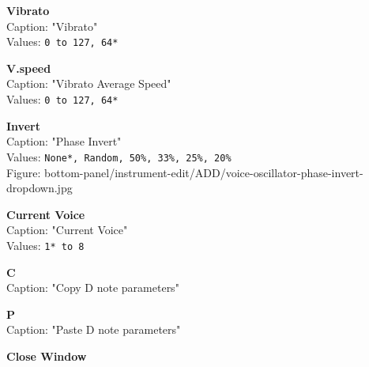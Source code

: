 \documentclass[
 11pt,
 twoside,
 a4paper,
 headinclude,
 footinclude,
 final                                 %
]{article}
\begin{document}
\begin{enumber}
\begin{enumber}
\begin{enumber}
\begin{enumber}
\begin{enumber}
\begin{enumber}
\begin{enumber}
                           \item \textbf{Vibrato} \\
                              Caption: "Vibrato" \\
                              Values: \texttt{0 to 127, 64*}
                           \item \textbf{V.speed} \\
                              Caption: "Vibrato Average Speed" \\
                              Values: \texttt{0 to 127, 64*}
                           \item \textbf{Invert} \\
                              Caption: "Phase Invert" \\
                              Values: \texttt{None*, Random, 50\%, 33\%, 25\%, 20\%} \\
                              Figure: bottom-panel/instrument-edit/ADD/voice-oscillator-phase-invert-dropdown.jpg
                        \end{enumber}
                        \item \textbf{Current Voice} \\
                           Caption: "Current Voice" \\
                           Values: \texttt{1* to 8}
                        \item \textbf{C} \\
                           Caption: "Copy D note parameters"
                        \item \textbf{P} \\
                           Caption: "Paste D note parameters"
                     \item \textbf{Close Window}
                  \end{enumber}
               \end{enumber}

            \end{enumber}


\end{enumber}
\end{enumber}
\end{enumber}
\end{document}
